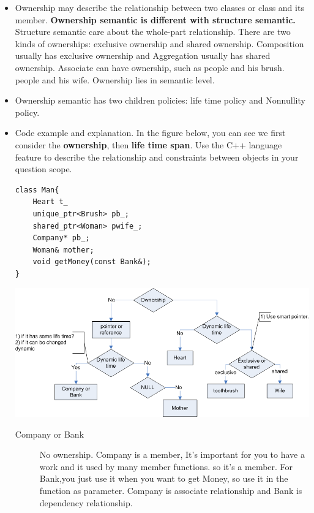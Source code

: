 \documentclass[a4paper,11pt,twoside]{book}
\begin{document}
\begin{itemize}
	\item Ownership may describe the relationship between two classes or class and its member. \textbf{Ownership semantic is different with structure semantic.} Structure semantic care about the whole-part relationship. There are two kinds of ownerships: exclusive ownership and shared ownership. Composition usually has exclusive ownership and Aggregation usually has shared ownership. Associate can have ownership, such as people and his brush. people and his wife. Ownership lies in semantic level. 
	
	\item Ownership semantic has two children policies: life time policy and Nonnullity policy. 
		
	\item Code example and explanation. In the figure below, you can see we first consider the \textbf{ownership}, then \textbf{life time span}. Use the C++ language feature to describe the relationship and constraints between objects in your question scope. 
	
\begin{lstlisting}
class Man{
	Heart t_   
	unique_ptr<Brush> pb_; 
	shared_ptr<Woman> pwife_; 
	Company* pb_; 
	Woman& mother; 
	void getMoney(const Bank&);
}
\end{lstlisting}


\begin{center}
		\includegraphics[width=0.92\linewidth]{pics/owner.png}
\end{center}


\begin{description}
	\item[Company or Bank] No ownership. Company is a member, It's important for you to have a work and it used by many member functions. so it's a member. For Bank,you just use it when you want to get Money, so use it in the function as parameter. Company is associate relationship and Bank is dependency relationship.
	

\end{description}
\end{itemize}
\end{document}
